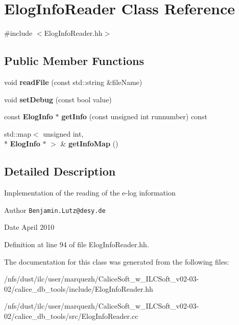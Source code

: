 \section{Elog\-Info\-Reader Class Reference}
\label{classElogInfoReader}


{\ttfamily \#include $<$Elog\-Info\-Reader.\-hh$>$}

\subsection*{Public Member Functions}
\begin{DoxyCompactItemize}
\item 
void {\bfseries read\-File} (const std\-::string \&file\-Name)\label{classElogInfoReader_ad674fcf005747d57caec2d4c1492a854}

\item 
void {\bfseries set\-Debug} (const bool value)\label{classElogInfoReader_af7bf62114dae8908c07a7d5c3dd0cd37}

\item 
const {\bf Elog\-Info} $\ast$ {\bfseries get\-Info} (const unsigned int runnumber) const \label{classElogInfoReader_ab8cfd17ba25398739b776c82d899fc19}

\item 
std\-::map$<$ unsigned int, \\*
{\bf Elog\-Info} $\ast$ $>$ \& {\bfseries get\-Info\-Map} ()\label{classElogInfoReader_ac09603fa1620ec6c486ed3059b4b6295}

\end{DoxyCompactItemize}


\subsection{Detailed Description}
Implementation of the reading of the e-\/log information

\begin{DoxyAuthor}{Author}
{\tt Benjamin.\-Lutz@desy.\-de} 
\end{DoxyAuthor}
\begin{DoxyDate}{Date}
April 2010 
\end{DoxyDate}


Definition at line 94 of file Elog\-Info\-Reader.\-hh.



The documentation for this class was generated from the following files\-:\begin{DoxyCompactItemize}
\item 
/nfs/dust/ilc/user/marquezh/\-Calice\-Soft\-\_\-w\-\_\-\-I\-L\-C\-Soft\-\_\-v02-\/03-\/02/calice\-\_\-db\-\_\-tools/include/Elog\-Info\-Reader.\-hh\item 
/nfs/dust/ilc/user/marquezh/\-Calice\-Soft\-\_\-w\-\_\-\-I\-L\-C\-Soft\-\_\-v02-\/03-\/02/calice\-\_\-db\-\_\-tools/src/Elog\-Info\-Reader.\-cc\end{DoxyCompactItemize}
